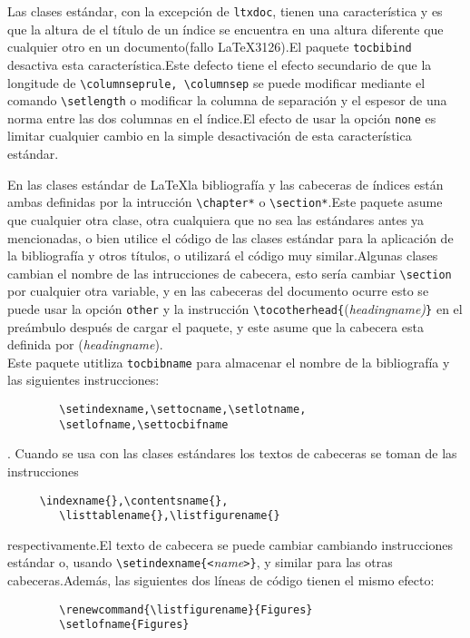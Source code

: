 	Las clases estándar, con la excepción de \verb+ltxdoc+, tienen una característica y es que la altura de el título de un índice se encuentra en una altura diferente que cualquier otro en un documento(fallo \LaTeX 3126).El paquete \verb+tocbibind+ desactiva esta característica.Este defecto tiene el efecto secundario de que la longitude de \verb+\columnseprule, \columnsep+ se puede modificar mediante el comando \verb+\setlength+ o modificar la columna de separación y el espesor de una norma entre las dos columnas en el índice.El efecto de usar la opción \verb+none+ es limitar cualquier cambio en la simple desactivación de esta característica estándar.

	En las clases estándar de \LaTeX la bibliografía y las cabeceras de índices están ambas definidas por la intrucción \verb+\chapter*+ o \verb+\section*+.Este paquete asume que cualquier otra clase, otra cualquiera que no sea las estándares antes ya mencionadas, o bien utilice el código de las clases estándar para la aplicación de la bibliografía y otros títulos, o utilizará el código muy similar.Algunas clases cambian el nombre de las intrucciones de cabecera, esto sería cambiar \verb+\section+ por cualquier otra variable, y en las cabeceras del documento ocurre esto se puede usar la opción \verb+other+ y la instrucción \verb+\tocotherhead+\verb+{+(\textit{headingname)}\verb+}+ en el preámbulo después de cargar el paquete, y este asume que la cabecera esta definida por (\textit{headingname}).\\
	Este  paquete utitliza \verb+tocbibname+ para almacenar el nombre de la bibliografía  y las siguientes instrucciones: \begin{verbatim}
		\setindexname,\settocname,\setlotname,
		\setlofname,\settocbifname
	\end{verbatim}.
	Cuando se usa con las clases estándares  los textos de cabeceras se toman de las instrucciones
	\begin{verbatim}
	 \indexname{},\contentsname{},
		\listtablename{},\listfigurename{}	
	\end{verbatim}
	respectivamente.El texto de cabecera  se puede cambiar cambiando instrucciones estándar o, usando \verb|\setindexname{|\verb|<|\emph{name}\verb|>|\verb|}|,  y similar para las otras cabeceras.Además, las siguientes dos líneas de código tienen el mismo efecto:
	\begin{verbatim}
		\renewcommand{\listfigurename}{Figures}
		\setlofname{Figures}
	\end{verbatim}

